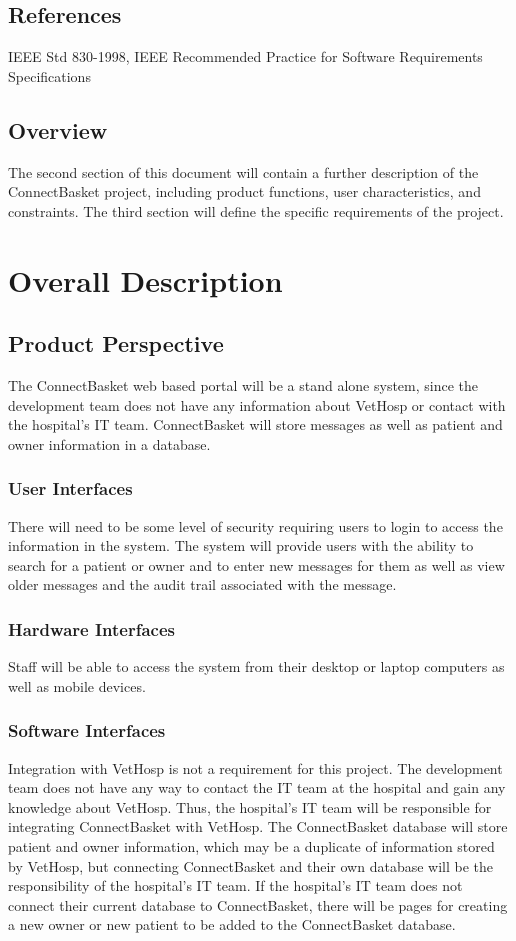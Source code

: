 \documentclass[onecolumn, draftclsnofoot,10pt, compsoc]{IEEEtran}
\begin{document}
\subsection{References}
IEEE Std 830-1998, IEEE Recommended Practice for Software Requirements Specifications

\subsection{Overview}
The second section of this document will contain a further description of the ConnectBasket project, including product functions, user characteristics, and constraints. The third section will define the specific requirements of the project. 

\section{Overall Description}

\subsection{Product Perspective}
The ConnectBasket web based portal will be a stand alone system, since the development team does not have any information about VetHosp or contact with the hospital's IT team. ConnectBasket will store messages as well as patient and owner information in a database. 

\subsubsection{User Interfaces}
There will need to be some level of security requiring users to login to access the information in the system. The system will provide users with the ability to search for a patient or owner and to enter new messages for them as well as view older messages and the audit trail associated with the message.

\subsubsection{Hardware Interfaces}
Staff will be able to access the system from their desktop or laptop computers as well as mobile devices.

\subsubsection{Software Interfaces}
Integration with VetHosp is not a requirement for this project. The development team does not have any way to contact the IT team at the hospital and gain any knowledge about VetHosp. Thus, the hospital's IT team will be responsible for integrating ConnectBasket with VetHosp. The ConnectBasket database will store patient and owner information, which may be a duplicate of information stored by VetHosp, but connecting ConnectBasket and their own database will be the responsibility of the hospital's IT team. If the hospital's IT team does not connect their current database to ConnectBasket, there will be pages for creating a new owner or new patient to be added to the ConnectBasket database. 
\end{document}
